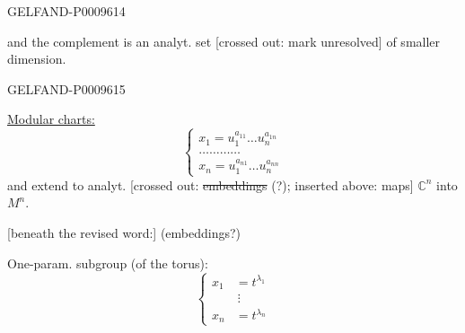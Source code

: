 \begin{GelfandAdjacentEvidence}{GELFAND-P000961}{4}


and the complement is an analyt. set [crossed out: mark unresolved] of smaller dimension.
\end{GelfandAdjacentEvidence}
\begin{GelfandAdjacentEvidence}{GELFAND-P000961}{5}


\underline{Modular charts:}
\begin{equation*}
 \begin{cases}
 x_1=u_1^{a_{11}}\ldots u_n^{a_{1n}}\\
 \ldots\ldots\ldots\ldots\\
 x_n=u_1^{a_{n1}}\ldots u_n^{a_{nn}}
 \end{cases}\tag{1}
\end{equation*}
and extend to analyt. [crossed out: \sout{embeddings} (?); inserted above: maps] $\mathbb{C}^n$ into $M^n$.

[beneath the revised word:] (embeddings?)
\end{GelfandAdjacentEvidence}


One-param. subgroup (of the torus):
\begin{equation*}
 \left\{\begin{aligned}
 x_1&=t^{\lambda_1}\\[-0.4ex]
 &\ \vdots\\
 x_n&=t^{\lambda_n}
 \end{aligned}\right.\tag{2}
\end{equation*}

